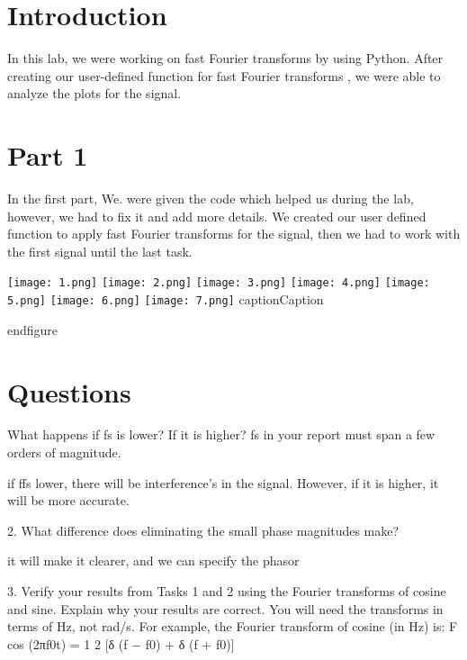 \documentclass[12pt]{report}
\begin{document}
\section{Introduction}

In this lab, we were working on fast Fourier transforms by using Python. After creating our user-defined function for fast Fourier transforms , we were able to analyze the plots for the signal.






\section{Part 1}

In the first part, We. were given the code which helped us during the lab, however, we had to fix it and add more details. We created our user defined function to apply fast Fourier transforms for the signal, then we had to work with the first signal until the last task.

    






\texttt{[image: 1.png]} 
\texttt{[image: 2.png]} 
\texttt{[image: 3.png]}
\texttt{[image: 4.png]}
\texttt{[image: 5.png]}
\texttt{[image: 6.png]}
\texttt{[image: 7.png]} 
  caption{Caption}

  end{figure}﻿







\section{Questions}
What happens if fs is lower? If it is higher? fs in your report must span a few orders of
magnitude.

if ffs lower, there will be interference's in the signal. However, if it is higher, it will be more accurate.

2. What difference does eliminating the small phase magnitudes make?

it will make it clearer, and we can specify the phasor

3. Verify your results from Tasks 1 and 2 using the Fourier transforms of cosine and sine. Explain why your results are correct. You will need the transforms in terms of Hz, not rad/s.
For example, the Fourier transform of cosine (in Hz) is:
F {cos (2πf0t)} =
1
2
[δ (f − f0) + δ (f + f0)]
\end{document}
